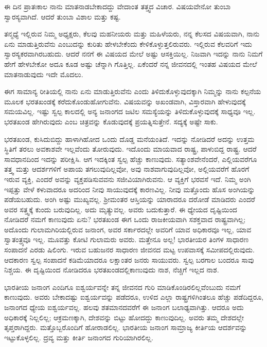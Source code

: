 ಈ ದಿನ ಪ್ರಾತಃಕಾಲ ನಾನು ಮಾತನಾಡಬೇಕಾದದ್ದು ವೇದಾಂತ ತತ್ತ್ವದ ವಿಚಾರ. ವಿಷಯವೇನೋ ತುಂಬಾ ಸ್ವಾರಸ್ಯವಾಗಿದೆ. ಆದರೆ ತುಂಬಾ ವಿಶಾಲ ಮತ್ತು ಕಷ್ಟ.

ತನ್ಮಧ್ಯೆ ಇಲ್ಲಿರುವ ನಿಮ್ಮ ಅಧ್ಯಕ್ಷರು, ಕೆಲವು ಮಹನೀಯರು ಮತ್ತು ಮಹಿಳೆಯರು, ನನ್ನ ಕೆಲಸದ ವಿಷಯವಾಗಿ, ನಾನು ಏನು ಮಾಡುತ್ತಿರುವೆನು ಎಂಬುದನ್ನು ಕುರಿತು ಹೇಳಬೇಕೆಂದು ಕೇಳಿಕೊಳ್ಳುತ್ತಲಿರುವರು. ಇಲ್ಲಿರುವ ಕೆಲವರಿಗೆ ಇದು ಸ್ವಾರಸ್ಯಕರವಾಗಿರಬಹುದು. ಆದರೆ ನನಗೆ ಈ ವಿಷಯದ ಮೇಲೆ ಅಷ್ಟು ಆಸಕ್ತಿಯಿಲ್ಲ. ನಿಜವಾಗಿ ಇದನ್ನು ನಾನು ನಿಮಗೆ ಹೇಗೆ ಹೇಳಬೇಕೋ ಅದೂ ಕೂಡ ಅಷ್ಟು ಚೆನ್ನಾಗಿ ಗೊತ್ತಿಲ್ಲ. ಏಕೆಂದರೆ ನನ್ನ ಜೀವನದಲ್ಲಿ ಇಂತಹ ವಿಷಯದ ಮೇಲೆ ಮಾತನಾಡುವುದು ಇದೇ ಮೊದಲು.

ಈಗ ಸಾಮಾನ್ಯ ರೀತಿಯಲ್ಲಿ ನಾನು ಏನು ಮಾಡುತ್ತಿರುವೆನು ಎಂದು ತಿಳಿದುಕೊಳ್ಳುವುದಕ್ಕಾಗಿ ನಿಮ್ಮನ್ನು ನಾನು ಕಲ್ಪನೆಯ ಮೂಲಕ ಭರತಖಂಡಕ್ಕೆ ಕರೆದುಕೊಂಡು\break ಹೋಗುವೆನು. ವಿಷಯವನ್ನು ಅಖಂಡವಾಗಿ, ವಿಸ್ತಾರವಾಗಿ ಹೇಳುವುದಕ್ಕೆ ಸಮಯವಿಲ್ಲ. ಇಷ್ಟು ಸ್ವಲ್ಪ ಕಾಲದಲ್ಲಿ ಅನ್ಯ ಜನಾಂಗದ ಜಟಿಲ ಸಮಸ್ಯೆಯನ್ನು ತಿಳಿದುಕೊಳ್ಳುವುದಕ್ಕೆ ಸಾಧ್ಯವೂ ಇಲ್ಲ. ಭರತಖಂಡ ಹೇಗಿರುವುದು ಎಂಬ ಚಿತ್ರವನ್ನು ಕೊಡುವುದಕ್ಕೆ ಪ್ರಯತ್ನಿಸುತ್ತೇನೆ. ಸದ್ಯಕ್ಕೆ ಅಷ್ಟೇ ಸಾಕು.

ಭರತಖಂಡ, ಕುಸಿದುಬಿದ್ದು ಹಾಳಾಗಿಹೋದ ಒಂದು ದೊಡ್ಡ ಮನೆಯಂತಿದೆ. ಇದನ್ನು ನೋಡಿದರೆ ಅದನ್ನು ಉತ್ತಮ ಸ್ಥಿತಿಗೆ ತರಲು ಅವಕಾಶವೇ ಇಲ್ಲವೆಂದು ತೋರುವುದು. ಇದೊಂದು ಮಾಯವಾದ ರಾಷ್ಟ್ರ, ಪಾಳುಬಿದ್ದ ರಾಷ್ಟ್ರ. ಆದರೆ ಸಾವಧಾನದಿಂದ ಇದನ್ನು ಪರೀಕ್ಷಿಸಿ. ಆಗ ಇದಕ್ಕಿಂತ ಸ್ವಲ್ಪ ಹೆಚ್ಚು ಕಾಣುವುದು. ಸತ್ಯಾಂಶವೇನೆಂದರೆ, ಎಲ್ಲಿಯವರೆಗೂ ತತ್ತ್ವ ಮತ್ತು ಆದರ್ಶಗಳಿಗೆ ಅಪಾಯ ತಗಲುವುದಿಲ್ಲವೋ, ಅವು ನಾಶವಾಗುವುದಿಲ್ಲವೋ, ಅಲ್ಲಿಯವರೆಗೆ ಹೊರಗೆ ಇರುವ ವ್ಯಕ್ತಿ, ಎಂದರೆ ಅವನ್ನು ವ್ಯಕ್ತಪಡಿಸುವವನು ಸಜೀವಿಯಾಗಿರುವನು. ಆ ವ್ಯಕ್ತಿಗೆ ಭರವಸೆ ಇದೆ. ನಿಮ್ಮ ಅಂಗಿ ಇಪ್ಪತ್ತು ವೇಳೆ ಕಳುವಾದರೂ ಅದರಿಂದ ನೀವು ಸಾಯುವುದಕ್ಕೆ ಕಾರಣವಿಲ್ಲ. ನೀವು ಮತ್ತೊಂದು ಹೊಸ ಅಂಗಿಯನ್ನು ಪಡೆಯಬಹುದು. ಅಂಗಿ ಅಷ್ಟು ಮುಖ್ಯವಲ್ಲ. ಶ‍್ರೀಮಂತರ ಆಸ್ತಿಯನ್ನು ಯಾರಾದರೂ ದರೋಡೆ ಮಾಡಿದರು ಎಂದರೆ ಅವರ ಸತ್ತ್ವಕ್ಕೆ ಕುಂದು ಬರುವುದಿಲ್ಲ. ಅದು ಮೃತ್ಯುವಲ್ಲ. ಅವರು ಬದುಕುತ್ತಾರೆ. ಈ ಧ್ಯೇಯದ ದೃಷ್ಟಿಯಿಂದ ನೋಡಿದರೆ ನಮಗೆ ಕಾಣುವುದು ಏನು? ಭರತಖಂಡ ಈಗ ಒಂದು ರಾಜಕೀಯವಾಗಿ ಸಶಕ್ತವಾದ ರಾಷ್ಟ್ರವಾಗಿಲ್ಲ; ಅದೊಂದು ಗುಲಾಮಗಿರಿಯಲ್ಲಿರುವ ಜನಾಂಗ, ಅವರ ಸರ್ಕಾರದಲ್ಲೇ ಅವರಿಗೆ ಯಾವ ಅಧಿಕಾರವೂ ಇಲ್ಲ, ಯಾವ ಸ್ವಾತಂತ್ರ್ಯವೂ ಇಲ್ಲ. ಮೂವತ್ತು ಕೋಟಿ ಗುಲಾಮರು ಅವರು. ಮತ್ತೇನೂ ಅಲ್ಲ! ಭಾರತೀಯರ ತಿಂಗಳ ಸಾಧಾರಣ ಸಂಪಾದನೆ ಎರಡು ಷಿಲಿಂಗು. ಇರುವ ಬಹುಜನರ ಸಾಧಾರಣ ಜೀವನದ ಮಟ್ಟ ಉಪವಾಸಕ್ಕೆ ಸಮೀಪದಲ್ಲಿರುವುದು. ಆದಕಾರಣ ಸ್ವಲ್ಪ ಸಂಪಾದನೆ ಕಡಿಮೆಯಾದರೂ ಲಕ್ಷಾಂತರ ಜನರು ಸಾಯುವರು. ಸ್ವಲ್ಪ ಬರಗಾಲ ಬಂದರೂ ಸಾವು ನಿಶ್ಚಯ. ಈ ದೃಷ್ಟಿಯಿಂದ ನೋಡಿದರೂ ಭರತಖಂಡದಲ್ಲಿ\break ಕಾಣುವುದು ನಾಶ, ನೆಚ್ಚಿಗೆ ಇಲ್ಲದ ನಾಶ.

ಭಾರತೀಯ ಜನಾಂಗ ಎಂದಿಗೂ ಐಶ್ವರ್ಯವನ್ನೇ ತನ್ನ ಜೀವನದ ಗುರಿ ಮಾಡಿಕೊಂಡಿರಲಿಲ್ಲವೆಂಬುದು ನಮಗೆ ಕಾಣುವುದು. ಅವರು ಬೇಕಾದಷ್ಟು ಐಶ್ವರ್ಯವನ್ನು ಪಡೆದರೂ, ಉಳಿದ ಎಲ್ಲಾ ರಾಷ್ಟ್ರಗಳಿಗಿಂತಲೂ ಹೆಚ್ಚು ಪಡೆದಿದ್ದರೂ, ಜನಾಂಗದ ಧ್ಯೇಯ ಐಶ್ವರ್ಯವಲ್ಲ. ಹಲವು ಶತಮಾನದವರೆಗೆ ಈ ಜನಾಂಗ ಬಲಾಢ್ಯವಾಗಿತ್ತು. ಆದರೂ ಅದು ಅಧಿಕಾರಕ್ಕೆ ನಿಲ್ಲಲಿಲ್ಲ; ಆಕ್ರಮಣಕ್ಕಾಗಿ, ದೇಶವನ್ನು ಬಿಟ್ಟು ಹೋದದ್ದು ಕಾಣುವುದಿಲ್ಲ. ಅವರು ತಮ್ಮ ದೇಶದಲ್ಲೇ ತೃಪ್ತರಾಗಿದ್ದರು. ಮತ್ತೊಬ್ಬರೊಂದಿಗೆ ಹೋರಾಡಲಿಲ್ಲ. ಭಾರತೀಯ ಜನಾಂಗ ಸಾಮ್ರಾಜ್ಯ ಕೀರ್ತಿಯ ಆದರ್ಶವನ್ನು ಇಟ್ಟುಕೊಳ್ಳಲಿಲ್ಲ. ದ್ರವ್ಯ ಮತ್ತು ಕೀರ್ತಿ ಜನಾಂಗದ ಗುರಿಯಾಗಿರಲಿಲ್ಲ.

